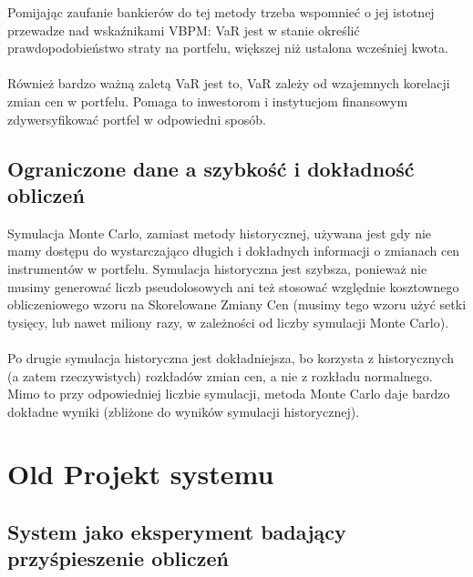 \documentclass[11pt,titlepage]{article}
\numberwithin{equation}{section}
\begin{document}
Pomijając zaufanie bankierów do tej metody trzeba wspomnieć o jej istotnej przewadze nad wskaźnikami VBPM: VaR jest w stanie określić prawdopodobieństwo straty na portfelu, większej niż ustalona wcześniej kwota. \\
\\

Również bardzo ważną zaletą VaR jest to, VaR zależy od wzajemnych korelacji zmian cen w portfelu. Pomaga to inwestorom i instytucjom finansowym zdywersyfikować portfel w odpowiedni sposób.


\subsection{Ograniczone dane a szybkość i dokładność obliczeń}
Symulacja Monte Carlo, zamiast metody historycznej, używana jest gdy nie mamy dostępu do wystarczająco długich i dokładnych informacji o zmianach cen instrumentów w portfelu. Symulacja historyczna jest szybsza, ponieważ nie musimy generować liczb pseudolosowych ani też stosować względnie kosztownego obliczeniowego wzoru na Skorelowane Zmiany Cen (musimy tego wzoru użyć setki tysięcy, lub nawet miliony razy, w zależności od liczby symulacji Monte Carlo). \\
\\
Po drugie symulacja historyczna jest dokładniejsza, bo korzysta z historycznych (a zatem rzeczywistych) rozkładów zmian cen, a nie z rozkładu normalnego. Mimo to przy odpowiedniej liczbie symulacji, metoda Monte Carlo daje bardzo dokładne wyniki (zbliżone do wyników symulacji historycznej).

\newpage

\section{Old Projekt systemu}


\subsection{System jako eksperyment badający przyśpieszenie obliczeń}
\end{document}
